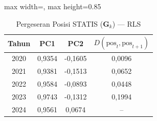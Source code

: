 \begin{table}[H]
\centering
\caption{Pergeseran Posisi STATIS ($\mathbf{G}_k$) --- RLS} \label{tab:app2jarak_statis_loading_rls}
\begin{adjustbox}{max width=\textwidth, max height=0.85\textheight}
\begin{tabular}{|c|c|c|c|}
\hline
\textbf{Tahun} & \textbf{PC1} & \textbf{PC2} & \textbf{$D(\text{pos}_t, \text{pos}_{t+1})$} \\
\hline
2020 & 0,9354 & -0,1605 & 0,0096 \\
2021 & 0,9381 & -0,1513 & 0,0652 \\
2022 & 0,9584 & -0,0893 & 0,0448 \\
2023 & 0,9743 & -0,1312 & 0,1994 \\
2024 & 0,9561 & 0,0674 & -- \\
\hline
\end{tabular}
\end{adjustbox}
\end{table}